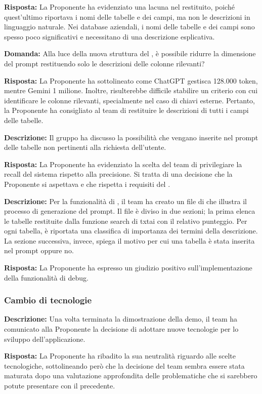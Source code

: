 \par \textbf{Risposta:} La Proponente ha evidenziato una lacuna nel  restituito, poiché quest'ultimo riportava i nomi delle tabelle e dei campi, ma non le descrizioni in linguaggio naturale. Nei database aziendali, i nomi delle tabelle e dei campi sono spesso poco significativi e necessitano di una descrizione esplicativa.
\par \textbf{Domanda:} Alla luce della nuova struttura del , è possibile ridurre la dimensione del prompt restituendo solo le descrizioni delle colonne rilevanti?
\par \textbf{Risposta:} La Proponente ha sottolineato come ChatGPT gestisca 128.000 token, mentre Gemini 1 milione. Inoltre, risulterebbe difficile stabilire un criterio con cui identificare le colonne rilevanti, specialmente nel caso di chiavi esterne. Pertanto, la Proponente ha consigliato al team di restituire le descrizioni di tutti i campi delle tabelle.

\par \textbf{Descrizione:} Il gruppo ha discusso la possibilità che vengano inserite nel prompt delle tabelle non pertinenti alla richiesta dell'utente.

\par \textbf{Risposta:} La Proponente ha evidenziato la scelta del team di privilegiare la recall del sistema rispetto alla precisione. Si tratta di una decisione che la Proponente si aspettava e che rispetta i requisiti del .

\par \textbf{Descrizione:} Per la funzionalità di , il team ha creato un file di  che illustra il processo di generazione del prompt. Il file è diviso in due sezioni; la prima elenca le tabelle restituite dalla funzione search di txtai con il relativo punteggio. Per ogni tabella, è riportata una classifica di importanza dei termini della descrizione. La sezione successiva, invece, spiega il motivo per cui una tabella è stata inserita nel prompt oppure no.
\par \textbf{Risposta:} La Proponente ha espresso un giudizio positivo sull'implementazione della funzionalità di debug.


\subsubsection{Cambio di tecnologie}

\par \textbf{Descrizione:} Una volta terminata la dimostrazione della demo, il team ha comunicato alla Proponente la decisione di adottare nuove tecnologie per lo sviluppo dell'applicazione.
\par \textbf{Risposta:} La Proponente ha ribadito la sua neutralità riguardo alle scelte tecnologiche, sottolineando però che la decisione del team sembra essere stata maturata dopo una valutazione approfondita delle problematiche che si sarebbero potute presentare con il  precedente.


